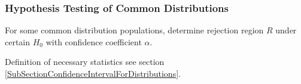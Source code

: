         



\subsubsection{Hypothesis Testing of Common Distributions}\label{SubSectionHypothesisTestingOfCommonDistributions}
    For some common distribution populations, determine rejection region $R$ under certain $H_0$ with confidence coefficient $\alpha$.

    Definition of necessary statistics see section {\autoref{SubSectionConfidenceIntervalForDistributions}}.

